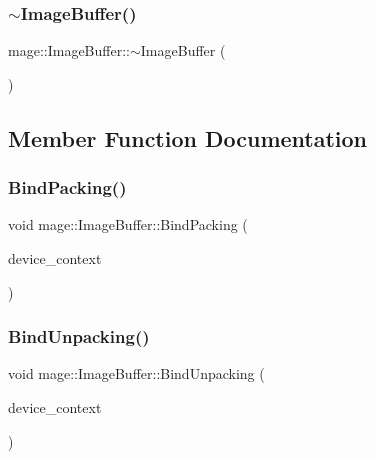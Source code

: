 \hypertarget{structmage_1_1_image_buffer_aa00e7ff960642ddb98f19502460a24a8}{}\label{structmage_1_1_image_buffer_aa00e7ff960642ddb98f19502460a24a8} 
\subsubsection{\texorpdfstring{$\sim$\+Image\+Buffer()}{~ImageBuffer()}}
{\footnotesize\ttfamily mage\+::\+Image\+Buffer\+::$\sim$\+Image\+Buffer (\begin{DoxyParamCaption}{ }\end{DoxyParamCaption})\hspace{0.3cm}{\ttfamily [default]}}



\subsection{Member Function Documentation}
\hypertarget{structmage_1_1_image_buffer_a23a4777a9a3a5d8bc4c13def5aa5cd41}{}\label{structmage_1_1_image_buffer_a23a4777a9a3a5d8bc4c13def5aa5cd41} 
\subsubsection{\texorpdfstring{Bind\+Packing()}{BindPacking()}}
{\footnotesize\ttfamily void mage\+::\+Image\+Buffer\+::\+Bind\+Packing (\begin{DoxyParamCaption}\item[{I\+D3\+D11\+Device\+Context2 $\ast$}]{device\+\_\+context }\end{DoxyParamCaption})\hspace{0.3cm}{\ttfamily [noexcept]}}

\hypertarget{structmage_1_1_image_buffer_a868356b0b6cbaad167bb63e8188e89d4}{}\label{structmage_1_1_image_buffer_a868356b0b6cbaad167bb63e8188e89d4} 
\subsubsection{\texorpdfstring{Bind\+Unpacking()}{BindUnpacking()}}
{\footnotesize\ttfamily void mage\+::\+Image\+Buffer\+::\+Bind\+Unpacking (\begin{DoxyParamCaption}\item[{I\+D3\+D11\+Device\+Context2 $\ast$}]{device\+\_\+context }\end{DoxyParamCaption})\hspace{0.3cm}{\ttfamily [noexcept]}}

